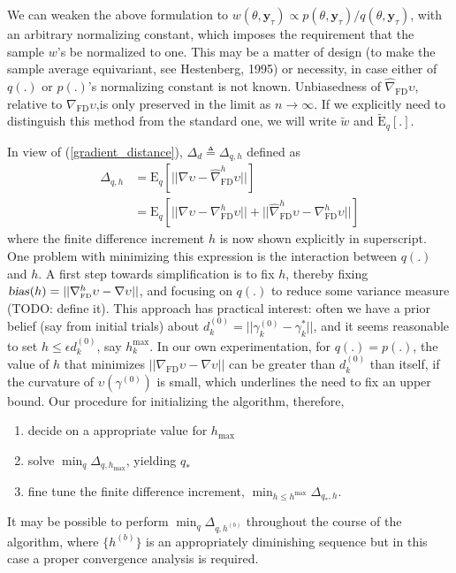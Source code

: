 \documentclass[11pt]{article}
\begin{document}
We can weaken the above formulation to
$w(\theta,\mathbf{y}_{\tau})\propto
p(\theta,\mathbf{y}_{\tau})/q(\theta,\mathbf{y}_{\tau})$, with an
arbitrary normalizing constant, which imposes the requirement that
the sample $w$'s be normalized to one. This may be a matter of
design (to make the sample average equivariant, see Hestenberg,
1995) or necessity, in case either of $q(.)$ or $p(.)$'s normalizing
constant is not known. Unbiasedness of
$\widehat{\nabla}_{\mathrm{\scriptscriptstyle FD}} \upsilon$,
relative to $\nabla_{\mathrm{\scriptscriptstyle FD}} \upsilon$,is
only preserved in the limit as $n\rightarrow \infty$. If we
explicitly need to distinguish this method from the standard one, we
will write $\tilde w$ and $\widetilde{\mathrm{E}}_q[.]$.


In view of (\ref{gradient_distance}), $\Delta_d \triangleq
\Delta_{q,h}$ defined as
\begin{align}
\Delta_{q,h} &=\mathrm{E}_q[||\nabla\upsilon-\widehat\nabla
_{\mathrm{\scriptscriptstyle FD}}^h\upsilon||]\\
&=\mathrm{E}_q[||\nabla\upsilon-\nabla _{\mathrm{\scriptscriptstyle
FD}}^h\upsilon||+||\widehat\nabla _{\mathrm{\scriptscriptstyle
FD}}^h\upsilon-\nabla _{\mathrm{\scriptscriptstyle FD}}^h\upsilon||]
\end{align}where the finite difference increment $h$ is now shown
explicitly in superscript. One problem with minimizing this
expression is the interaction between $q(.)$ and $h$. A first step
towards simplification is to fix $h$, thereby fixing
$\textsl{bias}_{}(h)=||\nabla_\mathrm{\scriptscriptstyle
FD}^h\upsilon-\nabla\upsilon||$, and focusing on $q(.)$ to reduce
some variance measure (TODO: define it). This approach has practical
interest: often we have a prior belief (say from initial trials)
about $d_k^{(0)}=||\gamma_k^{(0)}-\gamma_{k}^*||$, and it seems
reasonable to set $h\leq \epsilon d_k^{(0)}$, say $h_k^{\max}$. In
our own experimentation, for $q(.)=p(.)$, the value of $h$ that
minimizes $||\nabla_\mathrm{\scriptscriptstyle
FD}\upsilon-\nabla\upsilon||$ can be greater than $d_k^{(0)}$ than
itself, if the curvature of $\upsilon(\gamma^{(0)})$ is small, which
underlines the need to fix an upper bound. Our procedure for
initializing the algorithm, therefore, \begin{enumerate}\item decide
on a appropriate value for $h_{\max}$ \item solve $\min_q
\Delta_{q,h_{\max}}$, yielding $q_*$ \item fine tune the finite
difference increment, $\min_{h\leq
h^{\max}}\Delta_{q_*,h}$.\end{enumerate} It may be possible to
perform $\min_q \Delta_{q,h^{(b)}}$ throughout the course of the
algorithm, where $\{h^{(b)}\}$ is an appropriately diminishing
sequence but in this case a proper convergence analysis is required.
\end{document}
